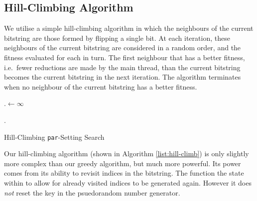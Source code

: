 \subsection{Hill-Climbing Algorithm}

We utilise a simple hill-climbing algorithm in which the neighbours of the
current bitstring are those formed by flipping a single bit.  At each
iteration, these neighbours of the current bitstring are considered in a random
order, and the fitness evaluated for each in turn. The first neighbour that has
a better fitness, i.e.~fewer reductions are made by the main thread, than the
current bitstring becomes the current bitstring in the next iteration.  The
algorithm terminates when no neighbour of the current bitstring has a better
fitness.

\begin{algorithm}
\DontPrintSemicolon
{}

\BlankLine

\Best.\Fitness $\leftarrow \infty$
\BlankLine

\BlankLine
\Return \Best.\Setting\;
\caption{Hill-Climbing \texttt{par}-Setting Search}
\label{list:hill-climb}
\end{algorithm}

Our hill-climbing algorithm (shown in Algorithm \ref{list:hill-climb}) is only
slightly more complex than our greedy algorithm, but much more powerful. Its
power comes from its ability to revisit indices in the bitstring. The function
 the state within  to allow for
already visited indices to be generated again. However it does \emph{not} reset
the key in the psuedorandom number generator.

